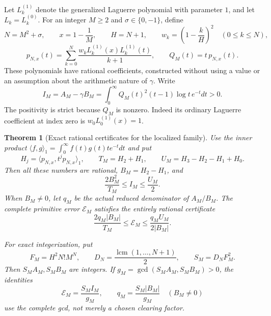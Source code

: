 \documentclass[11pt,a4paper]{article}
\newtheorem{theorem}{Theorem}[section]
\theoremstyle{definition}
\theoremstyle{remark}
\begin{document}
Let $L_k^{(1)}$ denote the generalized Laguerre polynomial with parameter
$1$, and let $L_k=L_k^{(0)}$. For an integer $M\ge2$ and
$\sigma\in\{0,-1\}$, define
\[
 N=M^2+\sigma,\qquad x=1-\frac1M,\qquad H=N+1,\qquad
 w_k=\left(1-\frac{k}{H}\right)^2\quad(0\le k\le N),
\]
\begin{equation}
 p_{N,x}(t)=
 \sum_{k=0}^N\frac{w_kL_k^{(1)}(x)L_k^{(1)}(t)}{k+1},
 \qquad Q_M(t)=t\,p_{N,x}(t).
 \label{stage3-localization-family}
\end{equation}
These polynomials have rational coefficients, constructed without using
a value or an assumption about the arithmetic nature of $\gamma$.
Write
\[
 I_M=A_M-\gamma B_M
 =\int_0^\infty Q_M(t)^2(t-1)\log t\,e^{-t}dt>0.
\]
The positivity is strict because $Q_M$ is nonzero. Indeed its ordinary
Laguerre coefficient at index zero is $w_0L_0^{(1)}(x)=1$.

\begin{theorem}[Exact rational certificates for the localized family]
\label{stage3-localization-sandwich}
Use the inner product
$\langle f,g\rangle_1=\int_0^\infty f(t)g(t)t e^{-t}dt$ and put
\[
 H_j=\langle p_{N,x},t^j p_{N,x}\rangle_1,\qquad
 T_M=H_2+H_1,\qquad U_M=H_3-H_2-H_1+H_0.
\]
Then all these numbers are rational, $B_M=H_2-H_1$, and
\begin{equation}
 \frac{2B_M^2}{T_M}\le I_M\le\frac{U_M}{2}.
 \label{stage3-localization-rational-sandwich}
\end{equation}
When $B_M\ne0$, let $q_M$ be the actual reduced denominator of $A_M/B_M$.
The complete primitive error $\mathcal E_M$ satisfies the entirely
rational certificate
\begin{equation}
 \frac{2q_M|B_M|}{T_M}
 \le\mathcal E_M
 \le\frac{q_MU_M}{2|B_M|}.
 \label{stage3-localization-primitive-sandwich}
\end{equation}

For exact integerization, put
\[
 F_M=H^2N!M^N,\qquad
 D_N=\frac{\operatorname{lcm}(1,\ldots,N+1)}2,\qquad
 S_M=D_NF_M^2.
\]
Then $S_MA_M,S_MB_M$ are integers. If
$g_M=\gcd(S_MA_M,S_MB_M)>0$, the identities
\[
 \mathcal E_M=\frac{S_MI_M}{g_M},\qquad
 q_M=\frac{S_M|B_M|}{g_M}\quad(B_M\ne0)
\]
use the complete gcd, not merely a chosen clearing factor.
\end{theorem}
\end{document}
